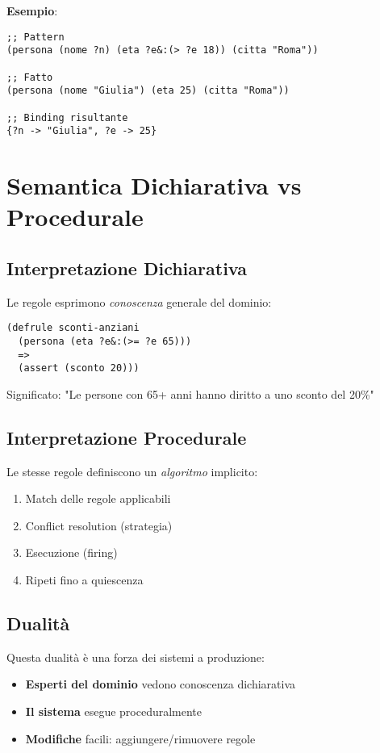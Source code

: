 \textbf{Esempio}:
\begin{lstlisting}[language=CLIPS]
;; Pattern
(persona (nome ?n) (eta ?e&:(> ?e 18)) (citta "Roma"))

;; Fatto
(persona (nome "Giulia") (eta 25) (citta "Roma"))

;; Binding risultante
{?n -> "Giulia", ?e -> 25}
\end{lstlisting}

\section{Semantica Dichiarativa vs Procedurale}

\subsection{Interpretazione Dichiarativa}

Le regole esprimono \textit{conoscenza} generale del dominio:

\begin{lstlisting}[language=CLIPS]
(defrule sconti-anziani
  (persona (eta ?e&:(>= ?e 65)))
  =>
  (assert (sconto 20)))
\end{lstlisting}

Significato: "Le persone con 65+ anni hanno diritto a uno sconto del 20\%"

\subsection{Interpretazione Procedurale}

Le stesse regole definiscono un \textit{algoritmo} implicito:

\begin{enumerate}
\item Match delle regole applicabili
\item Conflict resolution (strategia)
\item Esecuzione (firing)
\item Ripeti fino a quiescenza
\end{enumerate}

\subsection{Dualità}

Questa dualità è una forza dei sistemi a produzione:
\begin{itemize}
\item \textbf{Esperti del dominio} vedono conoscenza dichiarativa
\item \textbf{Il sistema} esegue proceduralmente
\item \textbf{Modifiche} facili: aggiungere/rimuovere regole
\end{itemize}

